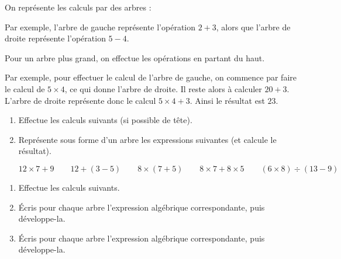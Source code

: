 \documentclass[class=report,crop=false, 12pt]{standalone}
\begin{document}

On représente les calculs par des arbres :


Par exemple, l'arbre de gauche représente l'opération $2 + 3$, alors que l'arbre de droite représente l'opération $5 - 4$.

Pour un arbre plus grand, on effectue les opérations en partant du haut.


Par exemple, pour effectuer le calcul de l'arbre de gauche, on commence par faire le calcul de $5 \times 4$, ce qui donne l'arbre de droite. Il reste alors à calculer $20 + 3$. L'arbre de droite représente donc le calcul $5 \times 4 + 3$. Ainsi le résultat est $23$.

\bigskip
\bigskip

\begin{activite}
\sauteligne 
\begin{enumerate}
  \item Effectue les calculs suivants (si possible de tête).


  
  \item Représente sous forme d'un arbre les expressions suivantes (et calcule le résultat).
  
  $$
  12 \times 7 + 9
  \qquad
  12 + (3 - 5)
  \qquad
  8 \times (7 + 5)
  \qquad
  8 \times 7 + 8 \times 5
  \qquad
  (6 \times 8) \div (13 - 9)
  $$
 
\end{enumerate}

\end{activite}


\begin{activite}%
\sauteligne
\begin{enumerate}
  \item Effectue les calculs suivants.
  

  
  \item Écris pour chaque arbre l'expression algébrique correspondante, puis développe-la.


  
  \item Écris pour chaque arbre l'expression algébrique correspondante, puis développe-la.
  
 
\end{enumerate}
\end{activite}
\end{document}
